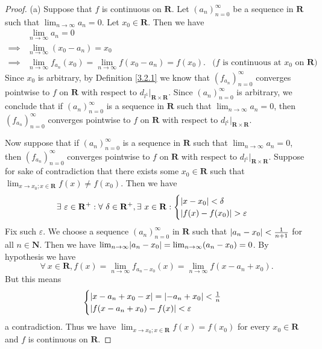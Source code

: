 \begin{proof}{(a)}
    Suppose that \(f\) is continuous on \(\mathbf{R}\).
    Let \((a_n)_{n = 0}^\infty\) be a sequence in \(\mathbf{R}\) such that \(\lim_{n \to \infty} a_n = 0\).
    Let \(x_0 \in \mathbf{R}\).
    Then we have
    \begin{align*}
                 & \lim_{n \to \infty} a_n = 0                                                                                                               \\
        \implies & \lim_{n \to \infty} (x_0 - a_n) = x_0                                                                                                     \\
        \implies & \lim_{n \to \infty} f_{a_n}(x_0) = \lim_{n \to \infty} f(x_0 - a_n) = f(x_0). & \text{(\(f\) is continuous at \(x_0\) on \(\mathbf{R}\))}
    \end{align*}
    Since \(x_0\) is arbitrary, by Definition \ref{3.2.1} we know that \((f_{a_n})_{n = 0}^\infty\) converges pointwise to \(f\) on \(\mathbf{R}\) with respect to \(d_{l^1}|_{\mathbf{R} \times \mathbf{R}}\).
    Since \((a_n)_{n = 0}^\infty\) is arbitrary, we conclude that if \((a_n)_{n = 0}^\infty\) is a sequence in \(\mathbf{R}\) such that \(\lim_{n \to \infty} a_n = 0\), then \((f_{a_n})_{n = 0}^\infty\) converges pointwise to \(f\) on \(\mathbf{R}\) with respect to \(d_{l^1}|_{\mathbf{R} \times \mathbf{R}}\).

    Now suppose that if \((a_n)_{n = 0}^\infty\) is a sequence in \(\mathbf{R}\) such that \(\lim_{n \to \infty} a_n = 0\), then \((f_{a_n})_{n = 0}^\infty\) converges pointwise to \(f\) on \(\mathbf{R}\) with respect to \(d_{l^1}|_{\mathbf{R} \times \mathbf{R}}\).
    Suppose for sake of contradiction that there exists some \(x_0 \in \mathbf{R}\) such that \(\lim_{x \to x_0 ; x \in \mathbf{R}} f(x) \neq f(x_0)\).
    Then we have
    \[
        \exists\ \varepsilon \in \mathbf{R}^+ : \forall\ \delta \in \mathbf{R}^+, \exists\ x \in \mathbf{R} : \begin{cases}
            \abs*{x - x_0} < \delta \\
            \abs*{f(x) - f(x_0)} > \varepsilon
        \end{cases}
    \]
    Fix such \(\varepsilon\).
    We choose a sequence \((a_n)_{n = 0}^\infty\) in \(\mathbf{R}\) such that \(\abs*{a_n - x_0} < \frac{1}{n + 1}\) for all \(n \in \mathbf{N}\).
    Then we have \(\lim_{n \to \infty} \abs*{a_n - x_0} = \lim_{n \to \infty} (a_n - x_0) = 0\).
    By hypothesis we have
    \[
        \forall\ x \in \mathbf{R}, f(x) = \lim_{n \to \infty} f_{a_n - x_0}(x) = \lim_{n \to \infty} f(x - a_n + x_0).
    \]
    But this means
    \[
        \begin{cases}
            \abs*{x - a_n + x_0 - x} = \abs*{-a_n + x_0} < \frac{1}{n} \\
            \abs*{f(x - a_n + x_0) - f(x)} < \varepsilon
        \end{cases}
    \]
    a contradiction.
    Thus we have \(\lim_{x \to x_0 ; x \in \mathbf{R}} f(x) = f(x_0)\) for every \(x_0 \in \mathbf{R}\) and \(f\) is continuous on \(\mathbf{R}\).
\end{proof}


